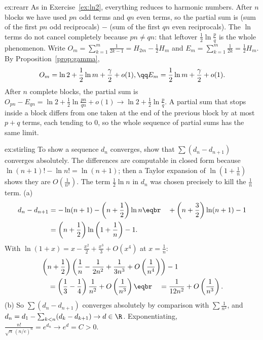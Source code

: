 \begin{solution}{ex:rearr}
\idea As in Exercise~\ref{ex:ln2}, everything reduces to harmonic numbers. After $n$ blocks we have used $pn$ odd terms and $qn$ even terms, so the partial sum is (sum of the first $pn$ odd reciprocals) $-$ (sum of the first $qn$ even reciprocals). The $\ln$ terms do not cancel completely because $pn\ne qn$: that leftover $\frac12\ln\frac pq$ is the whole phenomenon.
\writeup Write $O_m=\sum_{k=1}^m\frac1{2k-1}=H_{2m}-\frac12H_m$ and $E_m=\sum_{k=1}^m\frac1{2k}=\frac12H_m$. By Proposition~\ref{prop:gamma},
\[
\begin{gathered}O_m=\ln2+\frac12\ln m+\frac\gamma2+o(1),\qq E_m=\frac12\ln m+\frac\gamma2+o(1).\end{gathered}
\]
After $n$ complete blocks, the partial sum is
$O_{pn}-E_{qn}=\ln2+\frac12\ln\frac{pn}{qn}+o(1)\to\ln2+\frac12\ln\frac pq$.
A partial sum that stops inside a block differs from one taken at the end of the previous block by at most $p+q$ terms, each tending to $0$, so the whole sequence of
partial sums has the same limit.
\end{solution}

\begin{solution}{ex:stirling}
\idea To show a sequence $d_n$ converges, show that $\sum(d_n-d_{n+1})$ converges absolutely. The differences are computable in closed form because $\ln(n+1)!-\ln n!=\ln(n+1)$; then a Taylor expansion of $\ln(1+\frac1n)$ shows they are $O(\frac1{n^2})$. The term $\frac12\ln n$ in $d_n$ was chosen precisely to kill the $\frac1n$ term.
\writeup (a)
\[\begin{aligned}d_n-d_{n+1}&=-\ln(n+1)-\left(n+\frac12\right)\ln n\eqbr\quad+\left(n+\frac32\right)\ln(n+1)-1\\&=\left(n+\frac12\right)\ln\left(1+\frac1n\right)-1.\end{aligned}\]
With
$\ln(1+x)=x-\frac{x^2}2+\frac{x^3}3+O(x^4)$ at $x=\frac1n$:
\[
\begin{aligned}&\left(n+\frac12\right)\left(\frac1n-\frac1{2n^2}+\frac1{3n^3}+O\left(\frac1{n^4}\right)\right)-1\\
&\quad=\left(\frac13-\frac14\right)\frac1{n^2}+O\left(\frac1{n^3}\right)\eqbr\quad=\frac1{12n^2}+O\left(\frac1{n^3}\right).\end{aligned}
\]
(b) So $\sum(d_n-d_{n+1})$ converges absolutely by comparison with $\sum\frac1{n^2}$, and $d_n=d_1-\sum_{k<n}(d_k-d_{k+1})\to d\in\R$. Exponentiating,
$\frac{n!}{\sqrt n\,(n/e)^n}=e^{d_n}\to e^d=C>0$.
\end{solution}


